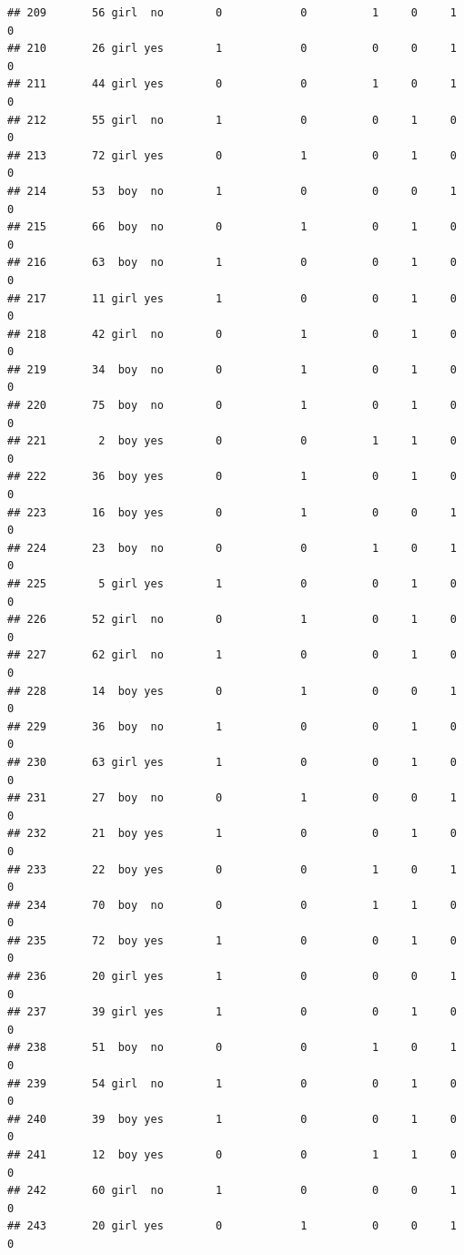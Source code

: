\documentclass[man]{apa6}
\begin{document}
\begin{verbatim}
## 209       56 girl  no        0            0          1     0     1     0
## 210       26 girl yes        1            0          0     0     1     0
## 211       44 girl yes        0            0          1     0     1     0
## 212       55 girl  no        1            0          0     1     0     0
## 213       72 girl yes        0            1          0     1     0     0
## 214       53  boy  no        1            0          0     0     1     0
## 215       66  boy  no        0            1          0     1     0     0
## 216       63  boy  no        1            0          0     1     0     0
## 217       11 girl yes        1            0          0     1     0     0
## 218       42 girl  no        0            1          0     1     0     0
## 219       34  boy  no        0            1          0     1     0     0
## 220       75  boy  no        0            1          0     1     0     0
## 221        2  boy yes        0            0          1     1     0     0
## 222       36  boy yes        0            1          0     1     0     0
## 223       16  boy yes        0            1          0     0     1     0
## 224       23  boy  no        0            0          1     0     1     0
## 225        5 girl yes        1            0          0     1     0     0
## 226       52 girl  no        0            1          0     1     0     0
## 227       62 girl  no        1            0          0     1     0     0
## 228       14  boy yes        0            1          0     0     1     0
## 229       36  boy  no        1            0          0     1     0     0
## 230       63 girl yes        1            0          0     1     0     0
## 231       27  boy  no        0            1          0     0     1     0
## 232       21  boy yes        1            0          0     1     0     0
## 233       22  boy yes        0            0          1     0     1     0
## 234       70  boy  no        0            0          1     1     0     0
## 235       72  boy yes        1            0          0     1     0     0
## 236       20 girl yes        1            0          0     0     1     0
## 237       39 girl yes        1            0          0     1     0     0
## 238       51  boy  no        0            0          1     0     1     0
## 239       54 girl  no        1            0          0     1     0     0
## 240       39  boy yes        1            0          0     1     0     0
## 241       12  boy yes        0            0          1     1     0     0
## 242       60 girl  no        1            0          0     0     1     0
## 243       20 girl yes        0            1          0     0     1     0

\end{verbatim}
\end{document}
